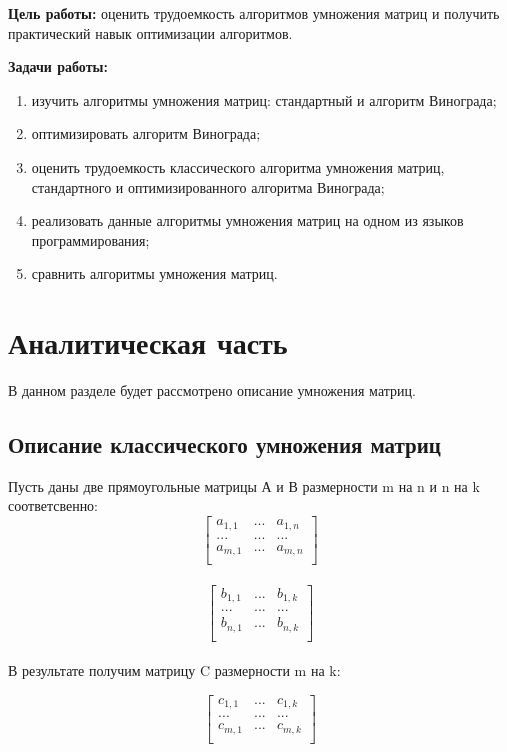 \documentclass[12pt]{report}
\begin{document}
\textbf{Цель работы:} оценить трудоемкость алгоритмов умножения матриц и получить практический навык оптимизации алгоритмов.\vspace{\baselineskip} 

\textbf{Задачи работы:}
\begin{enumerate}
  	\item изучить алгоритмы умножения матриц: стандартный и алгоритм Винограда; 
  	\item оптимизировать алгоритм Винограда; 
  	\item оценить трудоемкость классического алгоритма умножения матриц, стандартного и оптимизированного алгоритма Винограда;
  	\item реализовать данные алгоритмы умножения матриц на одном из языков программирования;  
  	\item сравнить алгоритмы умножения матриц.
\end{enumerate}


\chapter{Аналитическая часть}

В данном разделе будет рассмотрено описание умножения
матриц.

\section{Описание классического умножения матриц}
Пусть даны две прямоугольные матрицы А и В размерности m на n и n на k соответсвенно: 
\[ \begin{bmatrix}
	a_{1,1} & ... & a_{1,n} \\
	... & ... & ... \\
	a_{m,1} & ... & a_{m,n} \\
\end{bmatrix} \]\\

\[ \begin{bmatrix}
	b_{1,1} & ... & b_{1,k} \\
	... & ... & ... \\
	b_{n,1} & ... & b_{n,k} \\
\end{bmatrix} \]\\

В результате получим матрицу C размерности m на k:

\[ \begin{bmatrix}
	c_{1,1} & ... & c_{1,k} \\
	... & ... & ... \\
	c_{m,1} & ... & c_{m,k} \\
\end{bmatrix} \]\\
\end{document}
